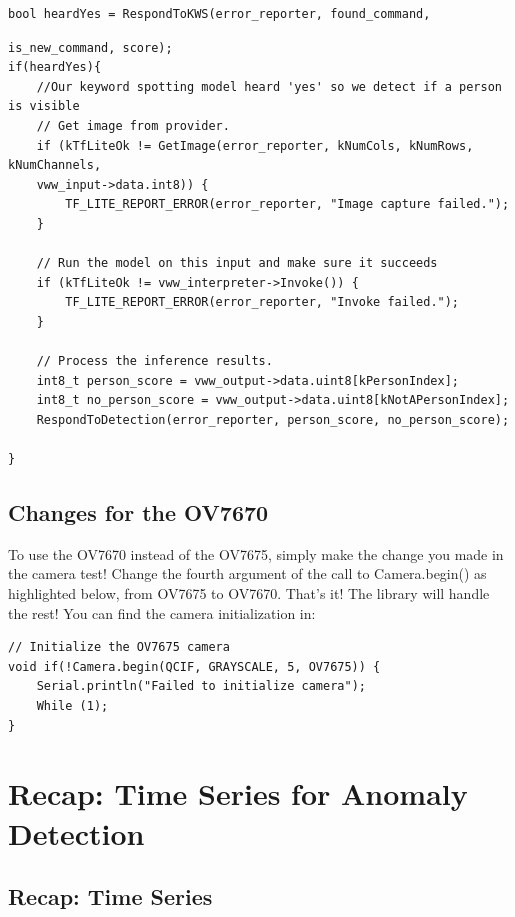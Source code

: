 \begin{lstlisting}
bool heardYes = RespondToKWS(error_reporter, found_command,
\end{lstlisting}

\begin{lstlisting}
is_new_command, score);
if(heardYes){
    //Our keyword spotting model heard 'yes' so we detect if a person is visible
    // Get image from provider.
    if (kTfLiteOk != GetImage(error_reporter, kNumCols, kNumRows, kNumChannels,
    vww_input->data.int8)) {
        TF_LITE_REPORT_ERROR(error_reporter, "Image capture failed.");
    }
    
    // Run the model on this input and make sure it succeeds
    if (kTfLiteOk != vww_interpreter->Invoke()) {
        TF_LITE_REPORT_ERROR(error_reporter, "Invoke failed.");
    }
    
    // Process the inference results.
    int8_t person_score = vww_output->data.uint8[kPersonIndex];
    int8_t no_person_score = vww_output->data.uint8[kNotAPersonIndex];
    RespondToDetection(error_reporter, person_score, no_person_score);
    
}
\end{lstlisting}


\subsection{Changes for the OV7670}

To use the OV7670 instead of the OV7675, simply make the change you made in the camera test! Change the fourth argument of the call to Camera.begin() as highlighted below, from OV7675 to OV7670. That’s it! The library will handle the rest! You can find the camera initialization in:

\begin{lstlisting}
// Initialize the OV7675 camera
void if(!Camera.begin(QCIF, GRAYSCALE, 5, OV7675)) {
    Serial.println("Failed to initialize camera");
    While (1);
}
\end{lstlisting}

\section{Recap: Time Series for Anomaly Detection}

\subsection{Recap: Time Series}

